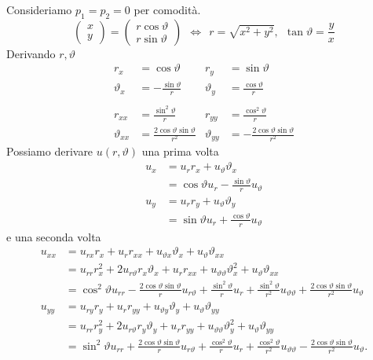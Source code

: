 \documentclass[10pt,a4paper,twoside,openright]{book}
\begin{document}
Consideriamo $p_{1} =p_{2} =0$ per comodità.
\begin{equation*}
\begin{pmatrix}
x\\
y
\end{pmatrix} =\begin{pmatrix}
r\cos \vartheta \\
r\sin \vartheta 
\end{pmatrix} \ \ \Leftrightarrow \ \ r=\sqrt{x^{2} +y^{2}},\ \ \tan \vartheta =\frac{y}{x}
\end{equation*}
Derivando $r,\vartheta $
\begin{align*}
r_{x} & =\cos \vartheta  & r_{y} & =\sin \vartheta \\
\vartheta _{x} & =-\frac{\sin \vartheta }{r} & \vartheta _{y} & =\frac{\cos \vartheta }{r}\\
 &  &  & \\
r_{xx} & =\frac{\sin^{2} \vartheta }{r} & r_{yy} & =\frac{\cos^{2} \vartheta }{r}\\
\vartheta _{xx} & =\frac{2\cos \vartheta \sin \vartheta }{r^{2}} & \vartheta _{yy} & =-\frac{2\cos \vartheta \sin \vartheta }{r^{2}}
\end{align*}
Possiamo derivare $u(r,\vartheta)$ una prima volta
\begin{equation*}
\begin{aligned}
u_{x} & =u_{r} r_{x} +u_{\vartheta } \vartheta _{x}\\
 & =\cos \vartheta u_{r} -\frac{\sin \vartheta }{r} u_{\vartheta }\\
u_{y} & =u_{r} r_{y} +u_{\vartheta } \vartheta _{y}\\
 & =\sin \vartheta u_{r} +\frac{\cos \vartheta }{r} u_{\vartheta }
\end{aligned}
\end{equation*}
e una seconda volta
\begin{equation*}
\begin{aligned}
u_{xx} & =u_{rx} r_{x} +u_{r} r_{xx} +u_{\vartheta x} \vartheta _{x} +u_{\vartheta } \vartheta _{xx}\\
 & =u_{rr} r^{2}_{x} +2u_{r\vartheta } r_{x} \vartheta _{x} +u_{r} r_{xx} +u_{\vartheta \vartheta } \vartheta ^{2}_{x} +u_{\vartheta } \vartheta _{xx}\\
 & =\cos^{2} \vartheta u_{rr} -\frac{2\cos \vartheta \sin \vartheta }{r} u_{r\vartheta } +\frac{\sin^{2} \vartheta }{r} u_{r} +\frac{\sin^{2} \vartheta }{r^{2}} u_{\vartheta \vartheta } +\frac{2\cos \vartheta \sin \vartheta }{r^{2}} u_{\vartheta }\\
u_{yy} & =u_{ry} r_{y} +u_{r} r_{yy} +u_{\vartheta y} \vartheta _{y} +u_{\vartheta } \vartheta _{yy}\\
 & =u_{rr} r^{2}_{y} +2u_{r\vartheta } r_{y} \vartheta _{y} +u_{r} r_{yy} +u_{\vartheta \vartheta } \vartheta ^{2}_{y} +u_{\vartheta } \vartheta _{yy}\\
 & =\sin^{2} \vartheta u_{rr} +\frac{2\cos \vartheta \sin \vartheta }{r} u_{r\vartheta } +\frac{\cos^{2} \vartheta }{r} u_{r} +\frac{\cos^{2} \vartheta }{r^{2}} u_{\vartheta \vartheta } -\frac{2\cos \vartheta \sin \vartheta }{r^{2}} u_{\vartheta } .
\end{aligned}
\end{equation*}
\end{document}
